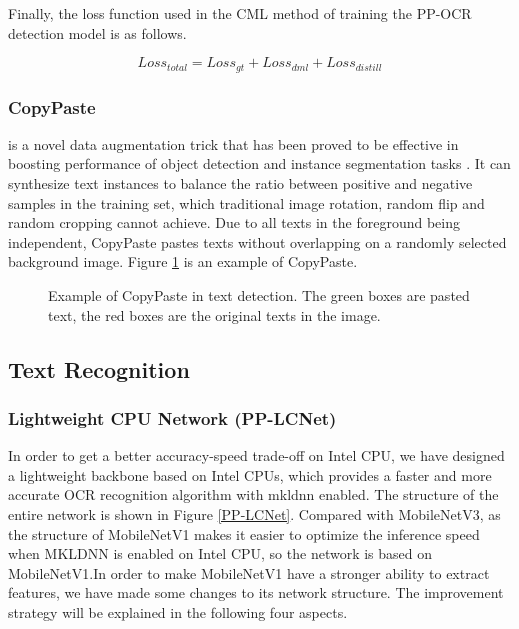 \documentclass[letterpaper]{article} %
\begin{document}
Finally, the loss function used in the CML method of training the PP-OCR detection model is as follows.
\begin{small}
\begin{equation}
Loss_{total} = Loss_{gt} + Loss_{dml} + Loss_{distill} 
\end{equation}
\label{loss_dml}
\end{small}

\subsubsection{CopyPaste} is a novel data augmentation trick that has been proved to be effective in boosting performance of object detection and instance segmentation tasks \cite{ghiasi2021simple}. It can synthesize text instances to balance the ratio between positive and negative samples in the training set, which traditional image rotation, random flip and random cropping cannot achieve. Due to all texts in the foreground being independent, CopyPaste pastes texts without overlapping on a randomly selected background image. Figure \ref{CopyPaste} is an example of CopyPaste.


\begin{figure}[h!]
\centering
{}
\caption{Example of CopyPaste in text detection. The green boxes are pasted text, the red boxes are the original texts in the image.}
\label{CopyPaste}
\end{figure}

\subsection{Text Recognition}
\subsubsection{Lightweight CPU Network (PP-LCNet)}

In order to get a better accuracy-speed trade-off on Intel CPU, we have designed a lightweight backbone based on Intel CPUs, which provides a faster and more accurate OCR recognition algorithm with mkldnn enabled. The structure of the entire network is shown in Figure \ref{PP-LCNet}. Compared with MobileNetV3, as the structure of MobileNetV1 makes it easier to optimize the inference speed when MKLDNN is enabled on Intel CPU, so the network is based on MobileNetV1\cite{1704.04861}.In order to make MobileNetV1 have a stronger ability to extract features, we have made some changes to its network structure. The improvement strategy will be explained in the following four aspects.
\end{document}
